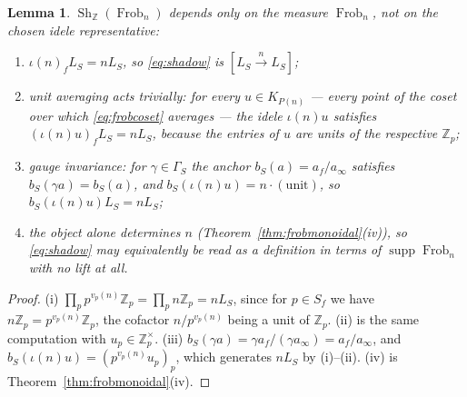 \documentclass[11pt]{amsart}
\newtheorem{lemma}[theorem]{Lemma}
\theoremstyle{definition}
\theoremstyle{remark}
\newcommand{\Z}{\mathbb Z}
\newcommand{\Frob}{\operatorname{Frob}}
\newcommand{\Sh}{\operatorname{Sh}}
\newcommand{\supp}{\operatorname{supp}}
\begin{document}
\begin{lemma}\label{lem:shwelldef}
$\Sh_\Z(\Frob_n)$ depends only on the measure $\Frob_n$, not on the chosen
idele representative:
\begin{enumerate}
\item[(i)] $\iota(n)_fL_S=nL_S$, so \eqref{eq:shadow} is
$[L_S\xrightarrow{n}L_S]$;
\item[(ii)] unit averaging acts trivially: for every $u\in K_{P(n)}$ --- every
point of the coset over which \eqref{eq:frobcoset} averages --- the idele
$\iota(n)u$ satisfies $(\iota(n)u)_fL_S=nL_S$, because the entries of $u$ are
units of the respective $\Z_p$;
\item[(iii)] gauge invariance: for $\gamma\in\Gamma_S$ the anchor
$b_S(a)=a_f/a_\infty$ satisfies $b_S(\gamma a)=b_S(a)$, and
$b_S(\iota(n)u)=n\cdot(\text{unit})$, so $b_S(\iota(n)u)L_S=nL_S$;
\item[(iv)] the object alone determines $n$
(Theorem~\ref{thm:frobmonoidal}(iv)), so \eqref{eq:shadow} may equivalently be
read as a definition in terms of $\supp\Frob_n$ with no lift at all.
\end{enumerate}
\end{lemma}

\begin{proof}
(i) $\prod_pp^{v_p(n)}\Z_p=\prod_pn\Z_p=nL_S$, since for $p\in S_f$ we have
$n\Z_p=p^{v_p(n)}\Z_p$, the cofactor $n/p^{v_p(n)}$ being a unit of $\Z_p$.
(ii) is the same computation with $u_p\in\Z_p^\times$. (iii)
$b_S(\gamma a)=\gamma a_f/(\gamma a_\infty)=a_f/a_\infty$, and
$b_S(\iota(n)u)=(p^{v_p(n)}u_p)_p$, which generates $nL_S$ by (i)--(ii). (iv)
is Theorem~\ref{thm:frobmonoidal}(iv).
\end{proof}
\end{document}
